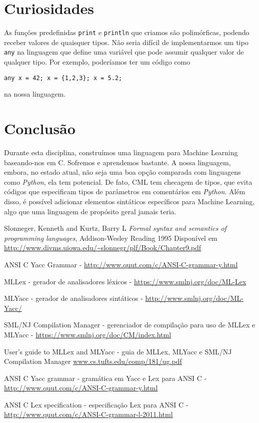 \documentclass[12pt]{article}
\begin{document}
\section{Curiosidades}
As funções predefinidas \texttt{print} e \texttt{println} que criamos são polimórficas, podendo receber valores de quaisquer tipos. Não seria difícil de implementarmos um tipo \texttt{any} na linguagem que define uma variável que pode assumir qualquer valor de qualquer tipo. Por exemplo, poderíamos ter um código como
\begin{Verbatim}
any x = 42; x = {1,2,3}; x = 5.2;
\end{Verbatim}

na nossa linguagem.
\section{Conclusão}
Durante esta disciplina, construímos uma linguagem para Machine Learning baseando-nos em C. Sofremos e aprendemos bastante. A nossa linguagem, embora, no estado atual, não seja uma boa opção comparada com linguagens como \textit{Python}, ela tem potencial. De fato, CML tem checagem de tipos, que evita códigos que especificam tipos de parâmetros em comentários em \textit{Python}. Além disso, é possível adicionar elementos sintáticos específicos para Machine Learning, algo que uma linguagem de propósito geral jamais teria.

\begin{thebibliography}{8}
  Slonneger, Kenneth and Kurtz, Barry L
  \textit{Formal syntax and semantics of programming languages},
  Addison-Wesley Reading
  1995
  Disponível em \url{http://www.divms.uiowa.edu/~slonnegr/plf/Book/Chapter9.pdf}

\item ANSI C Yacc Grammar - \url{http://www.quut.com/c/ANSI-C-grammar-y.html}

\item MLLex - gerador de analisadores léxicos -  \url{https://www.smlnj.org/doc/ML-Lex} 

\item MLYacc - gerador de analisadores sintáticos - \url{http://www.smlnj.org/doc/ML-Yacc/}

\item SML/NJ Compilation Manager - gerenciador de compilação para uso de MLLex e MLYacc - \url{https://www.smlnj.org/doc/CM/index.html}

\item User's guide to MLLex and MLYacc - guia de MLLex, MLYacc e SML/NJ Compilation Manager \url{www.cs.tufts.edu/comp/181/ug.pdf}

\item ANSI C Yacc grammar - gramática em Yacc e Lex para ANSI C - \url{http://www.quut.com/c/ANSI-C-grammar-y.html}

\item ANSI C Lex specification - especificação Lex para ANSI C - \url{http://www.quut.com/c/ANSI-C-grammar-l-2011.html}
\end{thebibliography}
	
\end{document}
